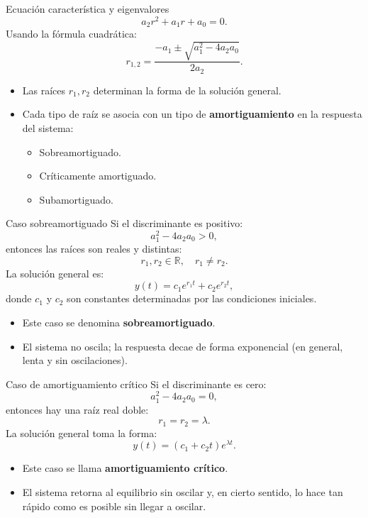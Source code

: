 \documentclass[../../main.tex]{subfiles}
\begin{document}
\begin{frame}{Ecuación característica y eigenvalores}
  \[
    a_2 r^2 + a_1 r + a_0 = 0.
  \]
  Usando la fórmula cuadrática:
  \[
    r_{1,2} = \frac{-a_1 \pm \sqrt{a_1^2 - 4 a_2 a_0}}{2a_2}.
  \]
  \begin{itemize}
    \item Las raíces \(r_1, r_2\) determinan la forma de la solución general.
    \item Cada tipo de raíz se asocia con un tipo de \textbf{amortiguamiento} en la respuesta del sistema:
    \begin{itemize}
      \item Sobreamortiguado.
      \item Críticamente amortiguado.
      \item Subamortiguado.
    \end{itemize}
  \end{itemize}
\end{frame}

\begin{frame}{Caso sobreamortiguado}
  Si el discriminante es positivo:
  \[
    a_1^2 - 4 a_2 a_0 > 0,
  \]
  entonces las raíces son reales y distintas:
  \[
    r_1, r_2 \in \mathbb{R}, \quad r_1 \neq r_2.
  \]
  La solución general es:
  \[
    y(t) = c_1 e^{r_1 t} + c_2 e^{r_2 t},
  \]
  donde \(c_1\) y \(c_2\) son constantes determinadas por las condiciones iniciales.
  \begin{itemize}
    \item Este caso se denomina \textbf{sobreamortiguado}.
    \item El sistema no oscila; la respuesta decae de forma exponencial (en general, lenta y sin oscilaciones).
  \end{itemize}
\end{frame}

\begin{frame}{Caso de amortiguamiento crítico}
  Si el discriminante es cero:
  \[
    a_1^2 - 4 a_2 a_0 = 0,
  \]
  entonces hay una raíz real doble:
  \[
    r_1 = r_2 = \lambda.
  \]
  La solución general toma la forma:
  \[
    y(t) = (c_1 + c_2 t) e^{\lambda t}.
  \]
  \begin{itemize}
    \item Este caso se llama \textbf{amortiguamiento crítico}.
    \item El sistema retorna al equilibrio sin oscilar y, en cierto sentido, lo hace tan rápido como es posible sin llegar a oscilar.
  \end{itemize}
\end{frame}
\end{document}
